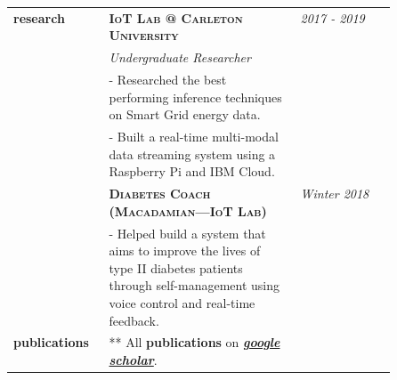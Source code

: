 \documentclass{article}
\begin{document}
\begin{longtable}{@{}>{\raggedleft}p{0.25\linewidth}
                          p{}>{}p{0.25\linewidth}@{}}
        \textbf{research}
            & \textbf{\textsc{IoT Lab @ Carleton University}} & \textit{2017 - 2019} \\
            & \textit{Undergraduate Researcher} \\
            & - Researched the best performing inference techniques on Smart Grid energy data. \\
            & - Built a real-time multi-modal data streaming system using a Raspberry Pi and IBM Cloud. \\ [2em]

            & \textbf{\textsc{Diabetes Coach (Macadamian---IoT Lab)}} & \textit{Winter 2018} \\
            & - Helped build a system that aims to improve the lives of type II diabetes patients through self-management using voice control and real-time feedback. \\ [2em]

        \textbf{publications}
            & ** All \textbf{publications} on \textit{\href{https://scholar.google.ca/citations?user=zFDREhgAAAAJ\&hl=en}{\textbf{google scholar}}}.\\ [1em]

  \end{longtable}
\end{document}
